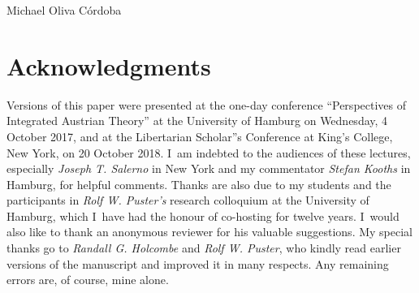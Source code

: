 \begin{artengenv}{Michael Oliva Córdoba}
\section{Acknowledgments}

Versions of this paper were presented at the one-day conference ``Perspectives of Integrated Austrian Theory'' at the University of Hamburg on Wednesday, 4 October 2017, and at the Libertarian Scholar''s Conference at King's College, New York, on 20 October 2018. I~am indebted to the audiences of these lectures, especially \textit{Joseph T. Salerno} in New York and my commentator \textit{Stefan Kooths} in Hamburg, for helpful comments. Thanks are also due to my students and the participants in \textit{Rolf W. Puster's} research colloquium at the University of Hamburg, which I~have had the honour of co-hosting for twelve years. I~would also like to thank an anonymous reviewer for his valuable suggestions. My special thanks go to \textit{Randall G. Holcombe} and \textit{Rolf W. Puster}, who kindly read earlier versions of the manuscript and improved it in many respects. Any remaining errors are, of course, mine alone.




\end{artengenv}

